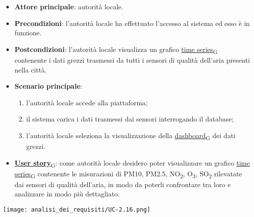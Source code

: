\begin{itemize}
	\item \textbf{Attore principale}: autorità locale.
	\item \textbf{Precondizioni}: l'autorità locale ha effettuato l'accesso al sistema ed esso è in funzione.
	\item \textbf{Postcondizioni}: l'autorità locale visualizza un grafico \href{https://7last.github.io/docs/pb/documentazione-interna/glossario\#time-series}{time series\textsubscript{G}} contenente i dati grezzi trasmessi da tutti i sensori
	      di qualità dell'aria presenti nella città.
	\item \textbf{Scenario principale}:
	      \begin{enumerate}
		      \item l'autorità locale accede alla piattaforma;
		      \item il sistema carica i dati trasmessi dai sensori interrogando il database;
		      \item l'autorità locale seleziona la visualizzazione della \href{https://7last.github.io/docs/pb/documentazione-interna/glossario\#dashboard}{dashboard\textsubscript{G}} dei dati grezzi.
	      \end{enumerate}
	\item \href{https://7last.github.io/docs/pb/documentazione-interna/glossario\#user-story}{\textbf{User story}\textsubscript{G}}:
	      come autorità locale desidero poter visualizzare un grafico \href{https://7last.github.io/docs/pb/documentazione-interna/glossario\#time-series}{time series\textsubscript{G}} contenente le misurazioni di PM10, PM2.5, NO\textsubscript{2}, O\textsubscript{3}, SO\textsubscript{2}
	      rilevatate dai sensori di qualità dell'aria, in modo da poterli confrontare tra loro e analizzare in modo più dettagliato.
\end{itemize}
\begin{center}
	\texttt{[image: analisi\_dei\_requisiti/UC-2.16.png]}
\end{center}


